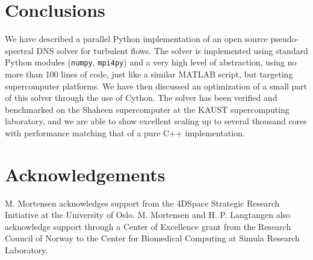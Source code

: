 \documentclass[11pt, oneside]{article}
\begin{document}
\section{Conclusions}

We have described a parallel Python implementation of an open source pseudo-spectral DNS solver for turbulent flows. The solver is implemented using standard Python modules (\texttt{numpy}, \texttt{mpi4py}) and a very high level of abstraction, using no more than 100 lines of code, just like a similar MATLAB script, but targeting supercomputer platforms. We have then discussed an optimization of a small part of this solver through the use of Cython. The solver has been verified and benchmarked on the Shaheen supercomputer at the KAUST supercomputing laboratory, and we are able to show excellent scaling up to several thousand cores with performance matching that of a pure C++ implementation.

\section*{Acknowledgements}
M. Mortensen acknowledges support from the 4DSpace Strategic Research Initiative at the University of Oslo. M. Mortensen and H. P. Langtangen also acknowledge support through a Center of Excellence grant from the Research Council of Norway to the Center for Biomedical Computing at Simula Research Laboratory.



\newpage
\end{document}
